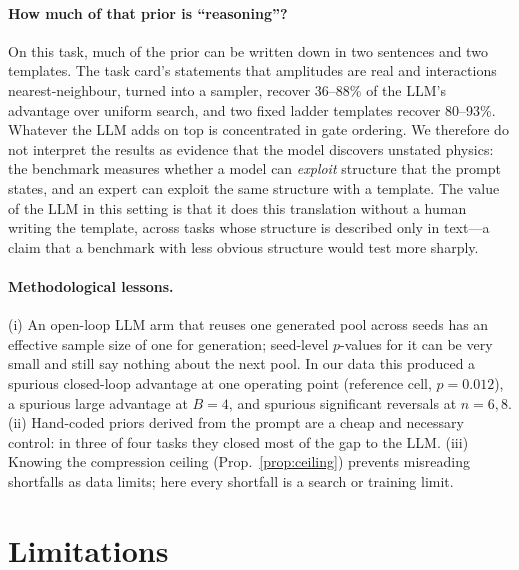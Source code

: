 \documentclass[11pt]{article}
\begin{document}
\paragraph{How much of that prior is ``reasoning''?}
On this task, much of the prior can be written down in two sentences and two
templates. The task card's statements that amplitudes are real and interactions
nearest-neighbour, turned into a sampler, recover 36--88\% of the LLM's advantage over
uniform search, and two fixed ladder templates recover 80--93\%. Whatever the LLM adds on
top is concentrated in gate ordering. We therefore do not interpret the results as
evidence that the model discovers unstated physics: the benchmark measures whether a
model can \emph{exploit} structure that the prompt states, and an expert can exploit the
same structure with a template. The value of the LLM in this setting is that it does
this translation without a human writing the template, across tasks whose structure
is described only in text---a claim that a benchmark with less obvious structure
would test more sharply.

\paragraph{Methodological lessons.}
(i) An open-loop LLM arm that reuses one generated pool across seeds has an effective
sample size of one for generation; seed-level $p$-values for it can be very small and
still say nothing about the next pool. In our data this produced a spurious
closed-loop advantage at one operating point (reference cell, $p=0.012$), a spurious
large advantage at $B=4$, and spurious significant reversals at $n=6,8$.
(ii) Hand-coded priors derived from the prompt are a cheap and necessary control: in
three of four tasks they closed most of the gap to the LLM.
(iii) Knowing the compression ceiling (Prop.~\ref{prop:ceiling}) prevents
misreading shortfalls as data limits; here every shortfall is a search or training
limit.

\section{Limitations}
\label{sec:limitations}
\end{document}
